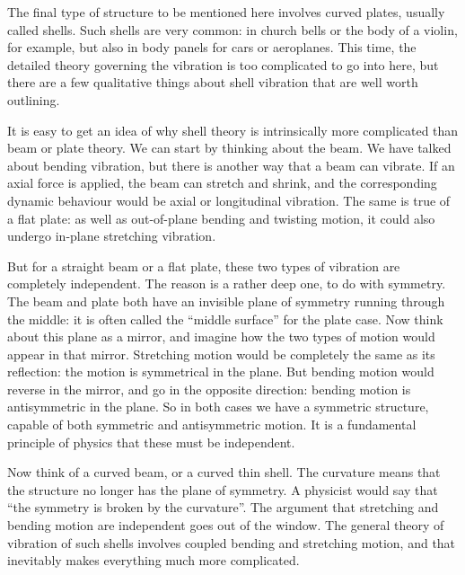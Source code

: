   The final type of structure to be mentioned here involves curved plates, 
  usually called shells. Such shells are very common: in church bells or the 
  body of a violin, for example, but also in body panels for cars or 
  aeroplanes. This time, the detailed theory governing the vibration is too 
  complicated to go into here, but there are a few qualitative things about 
  shell vibration that are well worth outlining. 

  It is easy to get an idea of why shell theory is intrinsically more 
  complicated than beam or plate theory. We can start by thinking about the 
  beam. We have talked about bending vibration, but there is another way that a 
  beam can vibrate. If an axial force is applied, the beam can stretch and 
  shrink, and the corresponding dynamic behaviour would be axial or 
  longitudinal vibration. The same is true of a flat plate: as well as 
  out-of-plane bending and twisting motion, it could also undergo in-plane 
  stretching vibration. 

  But for a straight beam or a flat plate, these two types of vibration are 
  completely independent. The reason is a rather deep one, to do with symmetry. 
  The beam and plate both have an invisible plane of symmetry running through 
  the middle: it is often called the ``middle surface'' for the plate case. Now 
  think about this plane as a mirror, and imagine how the two types of motion 
  would appear in that mirror. Stretching motion would be completely the same 
  as its reflection: the motion is symmetrical in the plane. But bending motion 
  would reverse in the mirror, and go in the opposite direction: bending motion 
  is antisymmetric in the plane. So in both cases we have a symmetric 
  structure, capable of both symmetric and antisymmetric motion. It is a 
  fundamental principle of physics that these must be independent. 

  Now think of a curved beam, or a curved thin shell. The curvature means that 
  the structure no longer has the plane of symmetry. A physicist would say that 
  ``the symmetry is broken by the curvature''. The argument that stretching and 
  bending motion are independent goes out of the window. The general theory of 
  vibration of such shells involves coupled bending and stretching motion, and 
  that inevitably makes everything much more complicated. 

